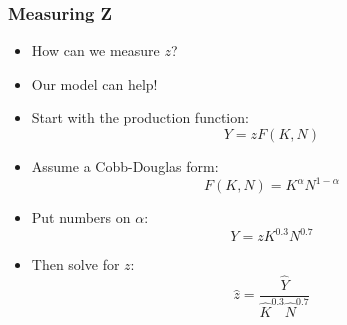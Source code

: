 \documentclass{beamer}
\begin{document}
\begin{frame}
\frametitle[alignment=center]{Measuring Z}
\begin{itemize}
\item How can we measure $z$?
\bigskip
\item Our model can help!
\item Start with the production function:
$$Y=zF(K,N)$$
\item Assume a Cobb-Douglas form:
$$F(K,N)=K^\alpha N^{1-\alpha}$$
\item Put numbers on $\alpha$:
$$Y=zK^{0.3}N^{0.7}$$
\item Then solve for $z$:
$$\hat{z}=\frac{\hat{Y}}{\hat{K}^{0.3}\hat{N}^{0.7}}$$
\end{itemize}
\end{frame}




%



%
%
%
\end{document}
